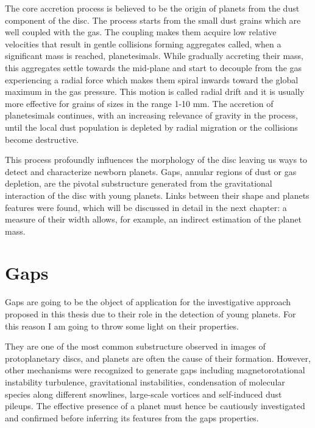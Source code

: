 \documentclass[a4paper,10pt]{report}
\begin{document}
The core accretion process \cite[pp. 25-26]{veronesi_phdthesis} is believed to be the origin of planets from the dust component of the disc. 
The process starts from the small dust grains which are well coupled with the gas.
The coupling makes them acquire low relative velocities that result in gentle collisions forming aggregates called, when a significant mass is reached, planetesimals.
While gradually accreting their mass, this aggregates settle towards the mid-plane and start to decouple from the gas experiencing a radial force 
which makes them spiral inwards toward the global maximum in the gas pressure. This motion is called radial drift and it is usually more effective for grains of sizes in the range 
1-10 mm.
The accretion of planetesimals continues, with an increasing relevance of gravity in the process,
until the local dust population is depleted by radial migration or the collisions become destructive.

This process profoundly influences the morphology of the disc leaving us ways to detect and characterize newborn planets. 
Gaps, annular regions of dust or gas depletion, are the pivotal substructure generated from the gravitational interaction of the disc with young planets.
Links between their shape and planets features were found, which will be discussed in detail in the next chapter:
a measure of their width allows, for example, an indirect estimation of the planet mass.

\section{Gaps}

Gaps are going to be the object of application for the investigative approach proposed in this thesis due
to their role in the detection of young planets.
For this reason I am going to throw some light on their properties.

They are one of the most common substructure observed in images of protoplanetary discs, and
planets are often the cause of their formation. However, other mechanisms were recognized to generate gaps
including magnetorotational instability turbulence, gravitational instabilities, condensation of molecular species along different snowlines,
large-scale vortices and self-induced dust pileups. The effective presence of a planet must hence be cautiously investigated and confirmed 
before inferring its features from the gaps properties. 
\end{document}
